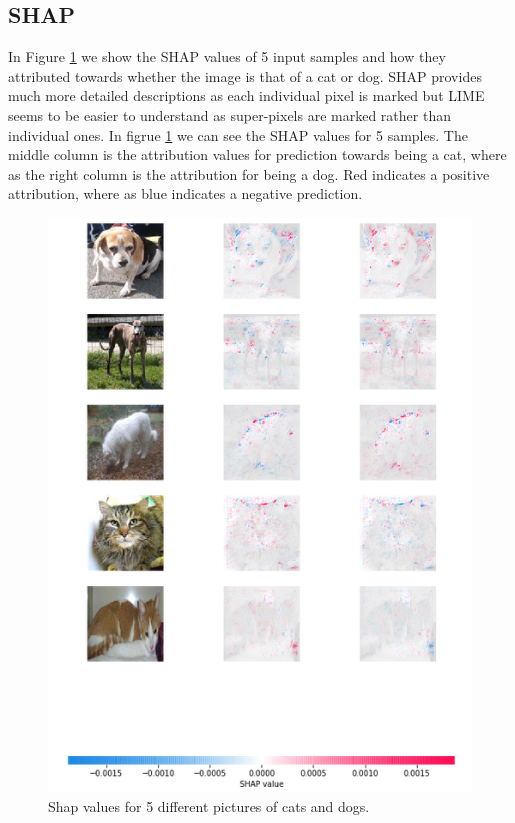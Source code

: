 \subsection{SHAP}
In Figure \ref{fig:shap-cat} we show the SHAP values of 5 input samples and how they attributed towards whether the image is that of a cat or dog. SHAP provides much more detailed descriptions as each individual pixel is marked but LIME seems to be easier to understand as super-pixels are marked rather than individual ones. In figrue \ref{fig:shap-cat} we can see the SHAP values for 5 samples. The middle column is the attribution values for prediction towards being a cat, where as the right column is the attribution for being a dog. Red indicates a positive attribution, where as blue indicates a negative prediction.
\begin  {figure}[!htpb]
  \includegraphics[width=\linewidth]{Evaluation_Images/CATS_DOGS_SHAP.png}
  \caption{Shap values for 5 different pictures of cats and dogs.}
  \label{fig:shap-cat}
\end{figure}

